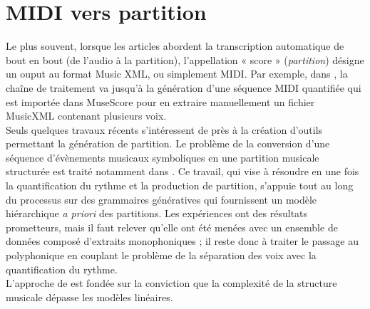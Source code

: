 \section{MIDI vers partition}
Le plus souvent, lorsque les articles abordent la transcription automatique de bout en bout (de l’audio à la partition), l’appellation « score » (\textit{partition}) désigne un ouput au format Music XML, ou simplement MIDI. Par exemple, dans \cite{SHIBATA2021262}, la chaîne de traitement va jusqu’à la génération d’une séquence MIDI quantifiée qui est importée dans MuseScore pour en extraire manuellement un fichier MusicXML contenant plusieurs voix.\\
Seuls quelques travaux récents s’intéressent de près à la création d’outils permettant la génération de partition. Le problème de la conversion d'une séquence d'évènements musicaux symboliques en une partition musicale structurée est traité notamment dans \cite{foscarin:hal-01988990}. Ce travail, qui vise à résoudre en une fois la quantification du rythme et la production de partition, s’appuie tout au long du processus sur  des grammaires génératives qui fournissent un modèle hiérarchique \textit{a priori} des partitions. Les expériences ont des résultats prometteurs, mais il faut relever qu’elle ont été menées avec un ensemble de données composé d'extraits monophoniques ; il reste donc à traiter le passage au polyphonique en couplant le problème de la séparation des voix avec la quantification du rythme.\\
L'approche de \cite{foscarin:hal-01988990} est fondée sur la conviction que la complexité de la structure musicale dépasse les modèles linéaires.
